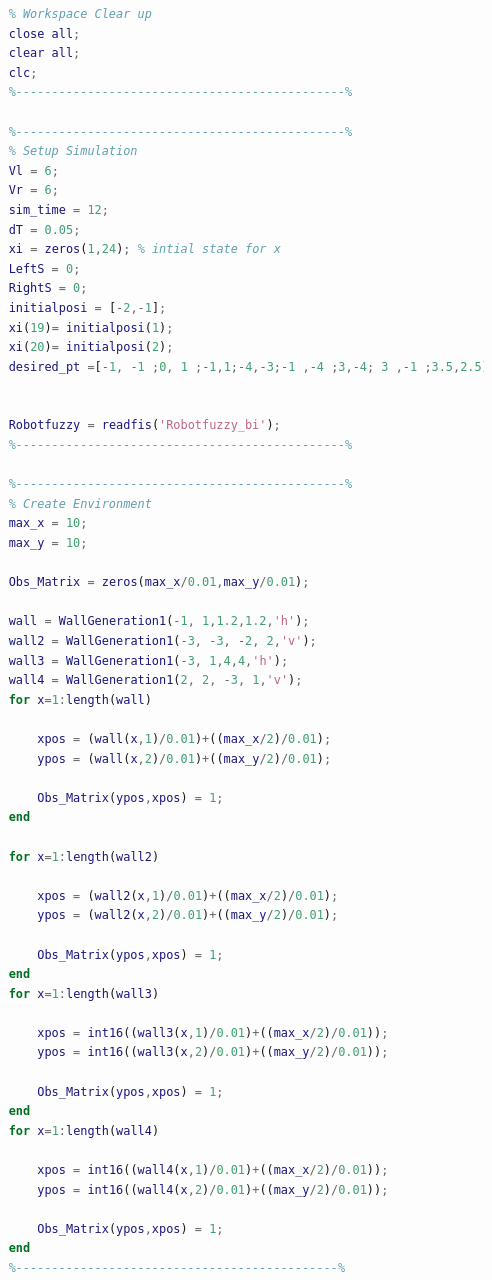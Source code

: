 \documentclass{l4proj}
\begin{document}
\begin{lstlisting}[language=Matlab, float, caption={Task 2 ,With a counter (Test 3-Final)}, label=lst:callahan]
    %----------------------------------------------%
    % Workspace Clear up
    close all;
    clear all;
    clc;
    %----------------------------------------------%
    
    %----------------------------------------------%
    % Setup Simulation
    Vl = 6;
    Vr = 6;
    sim_time = 12;
    dT = 0.05;
    xi = zeros(1,24); % intial state for x
    LeftS = 0;
    RightS = 0;
    initialposi = [-2,-1];
    xi(19)= initialposi(1);
    xi(20)= initialposi(2);
    desired_pt =[-1, -1 ;0, 1 ;-1,1;-4,-3;-1 ,-4 ;3,-4; 3 ,-1 ;3.5,2.5];
    
    
    Robotfuzzy = readfis('Robotfuzzy_bi');
    %----------------------------------------------%
    
    %----------------------------------------------%
    % Create Environment
    max_x = 10;
    max_y = 10;
    
    Obs_Matrix = zeros(max_x/0.01,max_y/0.01);
    
    wall = WallGeneration1(-1, 1,1.2,1.2,'h');
    wall2 = WallGeneration1(-3, -3, -2, 2,'v');
    wall3 = WallGeneration1(-3, 1,4,4,'h');
    wall4 = WallGeneration1(2, 2, -3, 1,'v');
    for x=1:length(wall)
        
        xpos = (wall(x,1)/0.01)+((max_x/2)/0.01);
        ypos = (wall(x,2)/0.01)+((max_y/2)/0.01);
        
        Obs_Matrix(ypos,xpos) = 1;
    end
    
    for x=1:length(wall2)
        
        xpos = (wall2(x,1)/0.01)+((max_x/2)/0.01);
        ypos = (wall2(x,2)/0.01)+((max_y/2)/0.01);
        
        Obs_Matrix(ypos,xpos) = 1;
    end
    for x=1:length(wall3)
        
        xpos = int16((wall3(x,1)/0.01)+((max_x/2)/0.01));
        ypos = int16((wall3(x,2)/0.01)+((max_y/2)/0.01));
        
        Obs_Matrix(ypos,xpos) = 1;
    end
    for x=1:length(wall4)
        
        xpos = int16((wall4(x,1)/0.01)+((max_x/2)/0.01));
        ypos = int16((wall4(x,2)/0.01)+((max_y/2)/0.01));
        
        Obs_Matrix(ypos,xpos) = 1;
    end
    %---------------------------------------------%
\end{lstlisting}
\end{document}
